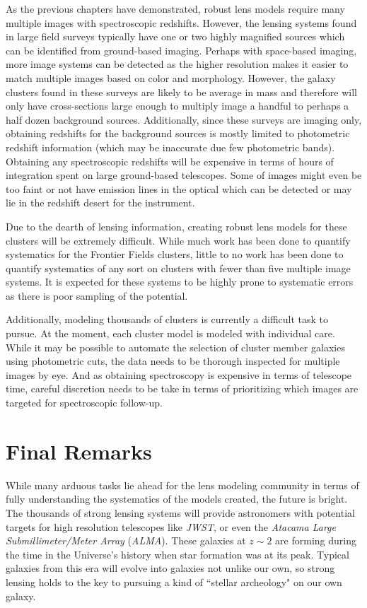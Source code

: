 As the previous chapters have demonstrated, robust lens models require many multiple images with spectroscopic redshifts. However, the lensing systems found in large field surveys typically have one or two highly magnified sources which can be identified from ground-based imaging. Perhaps with space-based imaging, more image systems can be detected as the higher resolution makes it easier to match multiple images based on color and morphology. However, the galaxy clusters found in these surveys are likely to be average in mass and therefore will only have cross-sections large enough to multiply image a handful to perhaps a half dozen background sources. Additionally, since these surveys are imaging only, obtaining redshifts for the background sources is mostly limited to photometric redshift information (which may be inaccurate due few photometric bands). Obtaining any spectroscopic redshifts will be expensive in terms of hours of integration spent on large ground-based telescopes. Some of images might even be too faint or not have emission lines in the optical which can be detected or may lie in the redshift desert for the instrument.

Due to the dearth of lensing information, creating robust lens models for these clusters will be extremely difficult. While much work has been done to quantify systematics for the Frontier Fields clusters, little to no work has been done to quantify systematics of any sort on clusters with fewer than five multiple image systems. It is expected for these systems to be highly prone to systematic errors as there is poor sampling of the potential.

Additionally, modeling thousands of clusters is currently a difficult task to pursue. At the moment, each cluster model is modeled with individual care. While it may be possible to automate the selection of cluster member galaxies using photometric cuts, the data needs to be thorough inspected for multiple images by eye. And as obtaining spectroscopy is expensive in terms of telescope time, careful discretion needs to be take in terms of prioritizing which images are targeted for spectroscopic follow-up.

\section{Final Remarks}

While many arduous tasks lie ahead for the lens modeling community in terms of fully understanding the systematics of the models created, the future is bright. The thousands of strong lensing systems will provide astronomers with potential targets for high resolution telescopes like {\it JWST}, or even the {\it Atacama Large Submillimeter/Meter Array} ({\it ALMA}). These galaxies at $z\sim2$ are forming during the time in the Universe's history when star formation was at its peak. Typical galaxies from this era will evolve into galaxies not unlike our own, so strong lensing holds to the key to pursuing a kind of ``stellar archeology" on our own galaxy.


